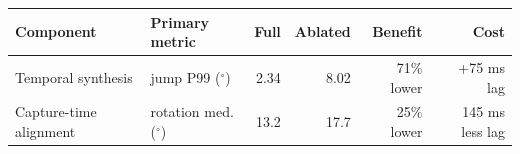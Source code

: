 \begin{tabular}{llrrrr}
\toprule
Component & Primary metric & Full & Ablated & Benefit & Cost \\
\midrule
Temporal synthesis & jump P99 ($^\circ$) &
2.34 &
8.02 &
71\% lower &
+75 ms lag \\
Capture-time alignment & rotation med. ($^\circ$) &
13.2 &
17.7 &
25\% lower &
145 ms less lag \\
\bottomrule
\end{tabular}
